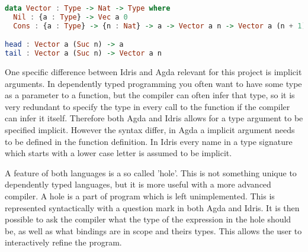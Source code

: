
\begin{lstlisting}[language=Haskell,label={lst:depex},caption={Definition of
a vector type in Idris, the type signatures of \textit{head} and \textit{tail}. \textit{n} is a type parameter, in this case it is a natural number.  }]
data Vector : Type -> Nat -> Type where
  Nil : {a : Type} -> Vec a 0
  Cons : {a : Type} -> {n : Nat} -> a -> Vector a n -> Vector a (n + 1)

head : Vector a (Suc n) -> a
tail : Vector a (Suc n) -> Vector a n
\end{lstlisting}




%

One specific difference between Idris and Agda relevant for this project is
implicit arguments. In dependently typed programming you often want to have
some type as a parameter to a function, but the compiler can often infer that
type, so it is very redundant to specify the type in every call to the function
if the compiler can infer it itself. Therefore both Agda and Idris allows for
a type argument to be specified implicit. However the syntax differ, in Agda
a implicit argument needs to be defined in the function definition. In Idris
every name in a type signature which starts with a lower case letter is assumed
to be implicit.

A feature of both languages is a so called 'hole'. This is not something unique
to dependently typed languages, but it is more useful with a more advanced
compiler. A hole is a part of program which is left unimplemented. This is
represented syntactically with a question mark in both Agda and Idris. It
is then possible to ask the compiler what the type of the expression in the
hole should be, as well as what bindings are in scope and theirs types. This
allows the user to interactively refine the program.


